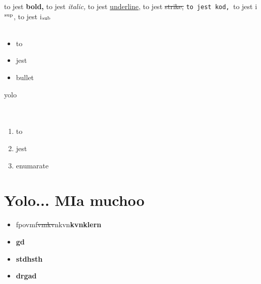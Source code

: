 \documentclass{article}
\begin{document}
to jest \textbf{bold, }to jest \textit{italic, }to jest \uline{underline,} to jest \sout{strike, }\texttt{to jest kod, }to jest i$^{\textnormal{sup}}$, to jest i$_{\textnormal{sub}}$\\\\\begin{itemize}\item to\item jest\item bullet\end{itemize}yolo\\\\\\\begin{enumerate}\item to\item jest\item enumarate\end{enumerate}
\section{Yolo... MIa muchoo}
\begin{itemize}\item fpovmf\sout{vmkv}nkvn\textbf{kvnklern}\item \textbf{gd}\item \textbf{stdhsth}\item \textbf{drgad}\end{itemize}
\end{document}
